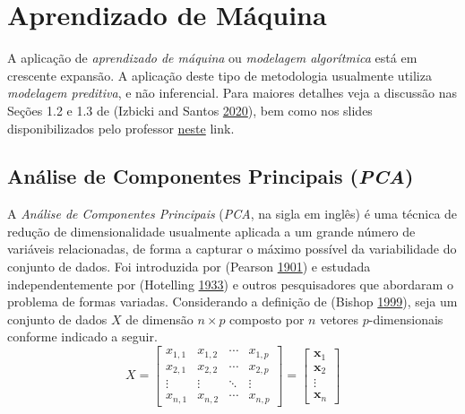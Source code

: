 \documentclass[
]{book}
\theoremstyle{definition}
\theoremstyle{definition}
\theoremstyle{definition}
\theoremstyle{remark}
\begin{document}
\hypertarget{aprendizadodemaquina}{%
\chapter{Aprendizado de Máquina}\label{aprendizadodemaquina}}

A aplicação de \emph{aprendizado de máquina} ou \emph{modelagem algorítmica} está em crescente expansão. A aplicação deste tipo de metodologia usualmente utiliza \emph{modelagem preditiva}, e não inferencial. Para maiores detalhes veja a discussão nas Seções 1.2 e 1.3 de (Izbicki and Santos \protect\hyperlink{ref-izbicki2020aprendizado}{2020}), bem como nos slides disponibilizados pelo professor \href{https://github.com/filipezabala/modelagem_preditiva}{neste} link.

\hypertarget{anuxe1lise-de-componentes-principais-pca}{%
\section{\texorpdfstring{Análise de Componentes Principais (\emph{PCA})}{Análise de Componentes Principais (PCA)}}\label{anuxe1lise-de-componentes-principais-pca}}

A \emph{Análise de Componentes Principais} (\emph{PCA}, na sigla em inglês) é uma técnica de redução de dimensionalidade usualmente aplicada a um grande número de variáveis relacionadas, de forma a capturar o máximo possível da variabilidade do conjunto de dados. Foi introduzida por (Pearson \protect\hyperlink{ref-pearson1901on}{1901}) e estudada independentemente por (Hotelling \protect\hyperlink{ref-hotelling1933analysis}{1933}) e outros pesquisadores que abordaram o problema de formas variadas. Considerando a definição de (Bishop \protect\hyperlink{ref-bishop1999bayesian}{1999}), seja um conjunto de dados \(X\) de dimensão \(n \times p\) composto por \(n\) vetores \(p\)-dimensionais conforme indicado a seguir. \[ X = \begin{bmatrix} x_{1,1} & x_{1,2} & \cdots & x_{1,p} \\ x_{2,1} & x_{2,2} & \cdots & x_{2,p} \\ \vdots & \vdots & \ddots & \vdots \\ x_{n,1} & x_{n,2} & \cdots & x_{n,p} \end{bmatrix} = \begin{bmatrix} \boldsymbol{x}_{1}  \\ \boldsymbol{x}_{2} \\ \vdots \\ \boldsymbol{x}_{n} \end{bmatrix} \]
\end{document}
